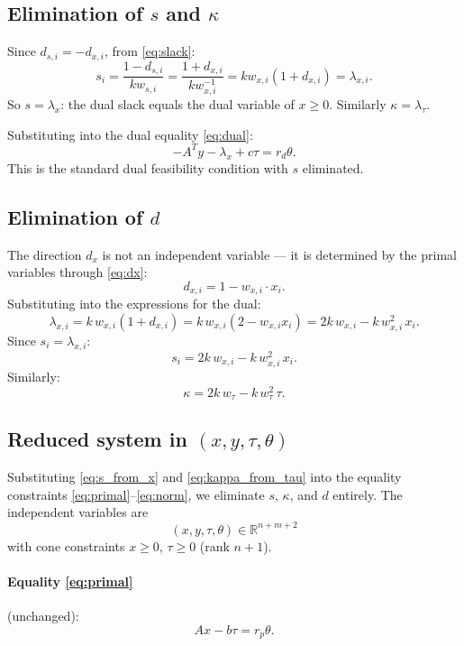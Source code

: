 \documentclass{article}
\newcommand{\R}{\mathbb{R}}
\begin{document}
\subsection{Elimination of $s$ and $\kappa$}

Since $d_{s,i} = -d_{x,i}$, from \eqref{eq:slack}:
\[
  s_i = \frac{1 - d_{s,i}}{k w_{s,i}} = \frac{1 + d_{x,i}}{k w_{x,i}^{-1}} = k w_{x,i}(1 + d_{x,i}) = \lambda_{x,i}.
\]
So \textbf{$s = \lambda_x$}: the dual slack equals the dual variable of $x \geq 0$. Similarly $\kappa = \lambda_\tau$.

Substituting into the dual equality \eqref{eq:dual}:
\[
  -A^T y - \lambda_x + c\tau = r_d \theta.
\]
This is the standard dual feasibility condition with $s$ eliminated.

\subsection{Elimination of $d$}

The direction $d_x$ is not an independent variable --- it is determined by the primal variables through \eqref{eq:dx}:
\[
  d_{x,i} = 1 - w_{x,i} \cdot x_i.
\]
Substituting into the expressions for the dual:
\[
  \lambda_{x,i} = k \, w_{x,i}(1 + d_{x,i}) = k \, w_{x,i}(2 - w_{x,i} x_i) = 2k \, w_{x,i} - k \, w_{x,i}^2 \, x_i.
\]
Since $s_i = \lambda_{x,i}$:
\begin{equation} \label{eq:s_from_x}
  s_i = 2k \, w_{x,i} - k \, w_{x,i}^2 \, x_i.
\end{equation}
Similarly:
\begin{equation} \label{eq:kappa_from_tau}
  \kappa = 2k \, w_\tau - k \, w_\tau^2 \, \tau.
\end{equation}

\subsection{Reduced system in $(x, y, \tau, \theta)$}

Substituting \eqref{eq:s_from_x} and \eqref{eq:kappa_from_tau} into the equality constraints \eqref{eq:primal}--\eqref{eq:norm}, we eliminate $s$, $\kappa$, and $d$ entirely. The independent variables are
\[
  (x, y, \tau, \theta) \in \R^{n + m + 2}
\]
with cone constraints $x \geq 0$, $\tau \geq 0$ (rank $n + 1$).

\paragraph{Equality \eqref{eq:primal}} (unchanged):
\begin{equation}
  Ax - b\tau = r_p \theta. \tag{E1}
\end{equation}
\end{document}
